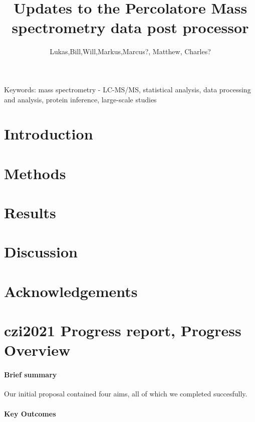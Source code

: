 \documentclass{article}
\title{Updates to the Percolatore Mass spectrometry data post processor}
\author{Lukas,Bill,Will,Markus,Marcus?, Matthew, Charles?}
\begin{document}
\maketitle

\doublespacing

Keywords: mass spectrometry - LC-MS/MS, statistical analysis, 
data processing and analysis, protein inference, large-scale studies


\newpage

\begin{abstract} 

\end{abstract}

\newpage

\section*{Introduction}


\section*{Methods}



\section*{Results}


\section*{Discussion}


\section*{Acknowledgements}
\section*{czi2021 Progress report, Progress Overview}

\paragraph{Brief summary}

Our initial proposal contained four aims, all of which we completed
succesfully.

\paragraph{Key Outcomes}
\end{document}

